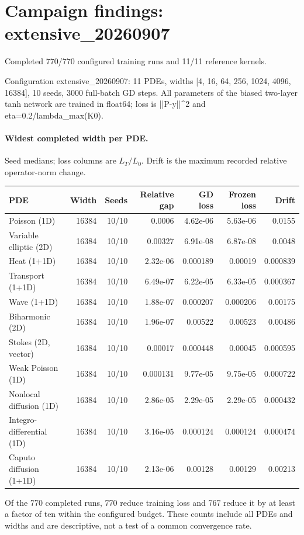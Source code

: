 \documentclass[10pt]{article}
\begin{document}
\section*{Campaign findings: extensive\_20260907}
Completed 770/770 configured training runs and 11/11 reference kernels.

Configuration extensive\_20260907: 11 PDEs, widths [4, 16, 64, 256, 1024, 4096, 16384], 10 seeds, 3000 full-batch GD steps. All parameters of the biased two-layer tanh network are trained in float64; loss is ||P-y||\textasciicircum{}2 and eta=0.2/lambda\_max(K0).

\paragraph{Widest completed width per PDE.}
Seed medians; loss columns are $L_T/L_0$. Drift is the maximum recorded relative operator-norm change.
\begin{center}\small\begin{tabular}{lrrrrrr}\toprule
PDE & Width & Seeds & Relative gap & GD loss & Frozen loss & Drift \\
\midrule
Poisson (1D) & 16384 & 10/10 & 0.0006 & 4.62e-06 & 5.63e-06 & 0.0155 \\
Variable elliptic (2D) & 16384 & 10/10 & 0.00327 & 6.91e-08 & 6.87e-08 & 0.0048 \\
Heat (1+1D) & 16384 & 10/10 & 2.32e-06 & 0.000189 & 0.00019 & 0.000839 \\
Transport (1+1D) & 16384 & 10/10 & 6.49e-07 & 6.22e-05 & 6.33e-05 & 0.000367 \\
Wave (1+1D) & 16384 & 10/10 & 1.88e-07 & 0.000207 & 0.000206 & 0.00175 \\
Biharmonic (2D) & 16384 & 10/10 & 1.96e-07 & 0.00522 & 0.00523 & 0.00486 \\
Stokes (2D, vector) & 16384 & 10/10 & 0.00017 & 0.000448 & 0.00045 & 0.000595 \\
Weak Poisson (1D) & 16384 & 10/10 & 0.000131 & 9.77e-05 & 9.75e-05 & 0.000722 \\
Nonlocal diffusion (1D) & 16384 & 10/10 & 2.86e-05 & 2.29e-05 & 2.29e-05 & 0.000432 \\
Integro-differential (1D) & 16384 & 10/10 & 3.16e-05 & 0.000124 & 0.000124 & 0.000474 \\
Caputo diffusion (1+1D) & 16384 & 10/10 & 2.13e-06 & 0.00128 & 0.00129 & 0.00213 \\
\bottomrule\end{tabular}\end{center}
Of the 770 completed runs, 770 reduce training loss and 767 reduce it by at least a factor of ten within the configured budget. These counts include all PDEs and widths and are descriptive, not a test of a common convergence rate.
\end{document}
